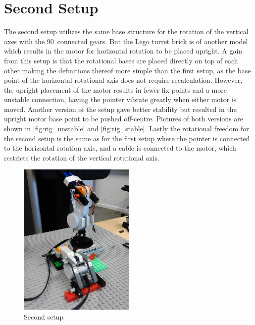 \section{Second Setup}
The second setup utilizes the same base structure for the rotation of the vertical axes with the 90\degree\ connected gears. But the Lego turret brick is of another model which results in the motor for horizontal rotation to be placed upright. A gain from this setup is that the rotational bases are placed directly on top of each other making the definitions thereof more simple than the first setup, as the base point of the horizontal rotational axis does not require recalculation. However, the upright placement of the motor results in fewer fix points and a more unstable connection, having the pointer vibrate greatly when either motor is moved. Another version of the setup gave better stability but resulted in the upright motor base point to be pushed off-centre. Pictures of both versions are shown in \cref{fig:rig_unstable} and \cref{fig:rig_stable}. Lastly the rotational freedom for the second setup is the same as for the first setup where the pointer is connected to the horizontal rotation axis, and a cable is connected to the motor, which restricts the rotation of the vertical rotational axis.

\begin{figure}[H]
    \centering
    \includegraphics[width=0.50\textwidth]{graphics/rig/rig_standing_entire.jpg}
    \caption{Second setup}
    \label{fig:rig_standing}
\end{figure}

